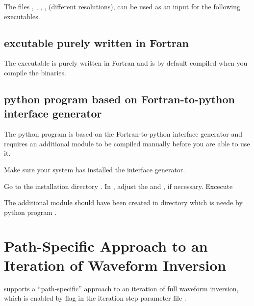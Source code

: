 The files , , , ,  
(different resolutions), can be
used as an input for the following executables.

\subsection{excutable purely written in Fortran}
The executable   
is purely written in Fortran and is by default compiled when you compile the \ASKI{} binaries.

\subsection{python program based on Fortran-to-python interface generator } \label{basic_steps,sec:shoreLines,ssec:py}
The python program  
is based on the Fortran-to-python interface generator  and requires an additional module to be
compiled manually before you are able to use it.

Make sure your system has installed the  interface generator.

Go to the \ASKI{} installation directory . In , adjust the 
and , if necessary. Excecute\\

The additional module  should have been created in directory 
which is neede by python program .

%
\section{Path-Specific Approach to an Iteration of Waveform Inversion} \label{basic_steps,sec:path_specific}
%
\ASKI{} supports a ``path-specific'' approach to an iteration of full waveform inversion, which is enabled
by flag  in the iteration step parameter file .


